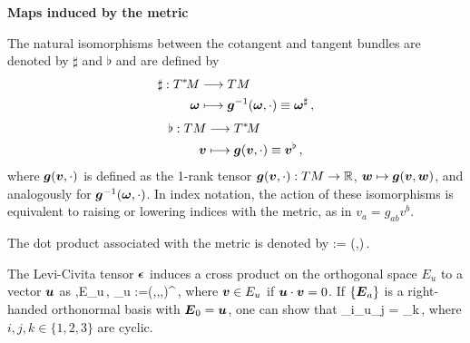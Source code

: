 \documentclass[12pt]{article}
\begin{document}
\begin{center} \bf Maps induced by the metric \end{center}
\noindent The natural isomorphisms between the cotangent and tangent bundles are denoted by $\sharp$ and $\flat$ and are defined by
\begin{align}
	\sharp:T^{*}\!M &\longrightarrow TM \notag \\
	\boldsymbol{\omega} &\longmapsto \boldsymbol{g}^{-1}(\boldsymbol{\omega},\cdot)\equiv\boldsymbol{\omega}^\sharp\,,
\end{align}
\begin{align}
	\flat: TM &\longrightarrow T^{*}\!M \notag \\
	\boldsymbol{v} &\longmapsto \boldsymbol{g}(\boldsymbol{v},\cdot)\equiv \boldsymbol{v}^\flat\,,
\end{align}
where $\boldsymbol{g}(\boldsymbol{v},\cdot)$ is defined as the 1-rank tensor $\boldsymbol{g}(\boldsymbol{v},\cdot):TM\to\mathbb{R}$, $\boldsymbol{w}\mapsto \boldsymbol{g}(\boldsymbol{v},\boldsymbol{w})$, and analogously for $\boldsymbol{g}^{-1}(\boldsymbol{\omega},\cdot)$. In index notation, the action of these isomorphisms is equivalent to raising or lowering indices with the metric, as in $v_a = g_{ab}v^b$.


\noindent The dot product associated with the metric is denoted by
\be
	\cdot {} := (,)\,.
\ee

\noindent The Levi-Civita tensor $\boldsymbol{\epsilon}$ induces a cross product on the orthogonal space $E_u$ to a vector $\boldsymbol{u}$ as
\be	
{},\in E_u\,, \quad \quad {}\cross_u :=\mbi{\epsilon}(,,,\cdot)^{\sharp}\,,
\ee
where $\boldsymbol{v}\in E_u$ if $\boldsymbol{u}\cdot \boldsymbol{v} = 0$. If $\{\boldsymbol{E}_a\}$ is a right-handed orthonormal basis with $\boldsymbol{E}_0 = \boldsymbol{u}$, one can show that
\be
	_i\cross_u_j = _k\,,
\ee
where $i,j,k\in\{1,2,3\}$ are cyclic.

\end{document}
